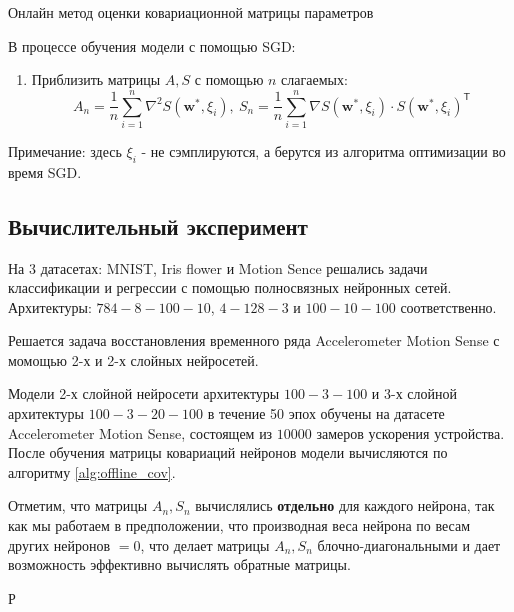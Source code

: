 \documentclass[12pt, twoside]{article}
\begin{document}
 \begin{algorithm}[H] 
         \caption{Онлайн метод оценки ковариационной матрицы параметров}\label{alg:online_cov} 
         В процессе обучения модели с помощью SGD:
         \begin{enumerate}
             \item Приблизить матрицы $A, S$ с помощью $n$ слагаемых:
             $$
             A_n = \frac{1}{n}\sum\limits_{i=1}^n\nabla^2S(\mathbf{w}^*, \xi_i), \ 
             S_n = \frac{1}{n}\sum\limits_{i=1}^n\nabla S(\mathbf{w}^*, \xi_i) \cdot S(\mathbf{w}^*, \xi_i)^{\mathsf{T}}
             $$
         \end{enumerate}
         Примечание: здесь $\xi_i$ - не сэмплируются, а берутся из алгоритма оптимизации во время SGD.
 \end{algorithm}

 \subsection{Вычислительный эксперимент}
На 3 датасетах: MNIST, Iris flower и Motion Sence решались задачи классификации и регрессии с помощью полносвязных нейронных сетей. Архитектуры: $784−8−100−10$, $4−128−3$ и $100−10−100$ соответственно. 



 
 Решается задача восстановления временного ряда Accelerometer Motion Sense с момощью 2-х и 2-х слойных нейросетей.

 Модели 2-х слойной нейросети архитектуры $100-3-100$ и 3-х слойной архитектуры $100-3-20-100$ в течение 50 эпох обучены на датасете Accelerometer Motion Sense, состоящем из $10000$ замеров ускорения устройства. После обучения матрицы ковариаций нейронов модели вычисляются по алгоритму \ref{alg:offline_cov}.

Отметим, что матрицы $A_n, S_n$ вычислялись \textbf{отдельно} для каждого нейрона, так как мы работаем в предположении, что производная веса нейрона по весам других нейронов $=0$, что делает матрицы $A_n, S_n$ блочно-диагональными и дает возможность эффективно вычислять обратные матрицы.

Р
\end{document}
